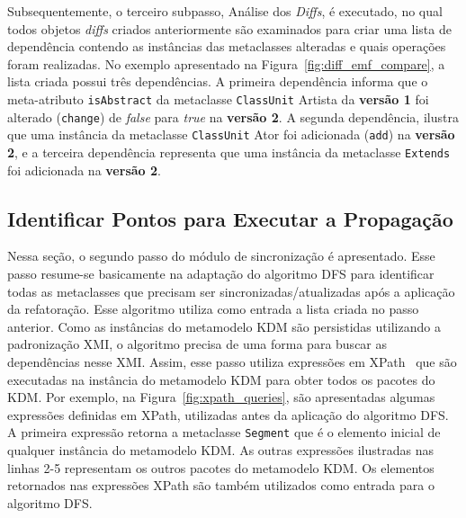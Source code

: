 
Subsequentemente, o terceiro subpasso, Análise dos \textit{Diffs}, é executado, no qual todos objetos \textit{diffs} criados anteriormente são examinados para criar uma lista de dependência contendo as instâncias das metaclasses alteradas e quais operações foram realizadas. No exemplo apresentado na Figura~\ref{fig:diff_emf_compare}, a lista criada possui três dependências. A primeira dependência informa que o meta-atributo \texttt{isAbstract} da metaclasse \texttt{ClassUnit} Artista da \textbf{versão 1} foi alterado (\texttt{change}) de \textit{false} para \textit{true} na \textbf{versão 2}. A segunda dependência, ilustra que uma instância da metaclasse \texttt{ClassUnit} Ator foi adicionada (\texttt{add}) na \textbf{versão 2}, e a terceira dependência representa que uma instância da metaclasse \texttt{Extends} foi adicionada na \textbf{versão 2}.


\subsection{Identificar Pontos para Executar a Propagação}\label{subsec:identificandoPontoParaExecutarApropagacao}

Nessa seção, o segundo passo do módulo de sincronização é apresentado. Esse passo resume-se basicamente na adaptação do algoritmo DFS para identificar todas as metaclasses que precisam ser sincronizadas/atualizadas após a aplicação da refatoração. Esse algoritmo utiliza como entrada a lista criada no passo anterior. Como as instâncias do metamodelo KDM são persistidas utilizando a padronização XMI, o algoritmo precisa de uma forma para buscar as dependências nesse XMI. Assim, esse passo utiliza expressões em XPath~\cite{kay2011xslt} que são executadas na instância do metamodelo KDM para obter todos os pacotes do KDM. Por exemplo, na Figura~\ref{fig:xpath_queries}, são apresentadas algumas expressões definidas em XPath, utilizadas antes da aplicação do algoritmo DFS. A primeira expressão retorna a metaclasse \texttt{Segment} que é o elemento inicial de qualquer instância do metamodelo KDM. As outras expressões ilustradas nas linhas 2-5 representam os outros pacotes do metamodelo KDM. Os elementos retornados nas expressões XPath são também utilizados como entrada para o algoritmo DFS.

